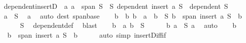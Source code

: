 \begin{isabellebody}
\isamarkupfalse%
%
\endisatagproof
{\isafoldproof}%
%
\isadelimproof
\isanewline
%
\endisadelimproof
\isanewline
{}\isamarkupfalse%
\ dependent{\isacharunderscore}{\kern0pt}insertD{\isacharcolon}{\kern0pt}\ \ a{\isacharcolon}{\kern0pt}\ {\isachardoublequoteopen}a\ {\isasymnotin}\ span\ S{\isachardoublequoteclose}\ \ S{\isacharcolon}{\kern0pt}\ {\isachardoublequoteopen}dependent\ {\isacharparenleft}{\kern0pt}insert\ a\ S{\isacharparenright}{\kern0pt}{\isachardoublequoteclose}\ \ {\isachardoublequoteopen}dependent\ S{\isachardoublequoteclose}\isanewline
%
\isadelimproof
%
\endisadelimproof
%
\isatagproof
{}\isamarkupfalse%
\ {\isacharminus}{\kern0pt}\isanewline
\ \ \isamarkupfalse%
\ {\isachardoublequoteopen}a\ {\isasymnotin}\ S{\isachardoublequoteclose}\ \isamarkupfalse%
\ a\ \isamarkupfalse%
\ {\isacharparenleft}{\kern0pt}auto\ dest{\isacharcolon}{\kern0pt}\ span{\isacharunderscore}{\kern0pt}base{\isacharparenright}{\kern0pt}\isanewline
\ \ \isamarkupfalse%
\ b\ \ b{\isacharcolon}{\kern0pt}\ {\isachardoublequoteopen}b\ {\isacharequal}{\kern0pt}\ a\ {\isasymor}\ b\ {\isasymin}\ S{\isachardoublequoteclose}\ {\isachardoublequoteopen}b\ {\isasymin}\ span\ {\isacharparenleft}{\kern0pt}insert\ a\ S\ {\isacharminus}{\kern0pt}\ {\isacharbraceleft}{\kern0pt}b{\isacharbraceright}{\kern0pt}{\isacharparenright}{\kern0pt}{\isachardoublequoteclose}\isanewline
\ \ \ \ \isamarkupfalse%
\ S\ \isamarkupfalse%
\ dependent{\isacharunderscore}{\kern0pt}def\ \isamarkupfalse%
\ blast\isanewline
\ \ \isamarkupfalse%
\ {\isachardoublequoteopen}b\ {\isasymnoteq}\ a{\isachardoublequoteclose}\ {\isachardoublequoteopen}b\ {\isasymin}\ S{\isachardoublequoteclose}\isanewline
\ \ \ \ \isamarkupfalse%
\ b\ {\isacartoucheopen}a\ {\isasymnotin}\ S{\isacartoucheclose}\ a\ \isamarkupfalse%
\ auto\isanewline
\ \ \isamarkupfalse%
\ b\ \isamarkupfalse%
\ {\isacharasterisk}{\kern0pt}{\isacharcolon}{\kern0pt}\ {\isachardoublequoteopen}b\ {\isasymin}\ span\ {\isacharparenleft}{\kern0pt}insert\ a\ {\isacharparenleft}{\kern0pt}S\ {\isacharminus}{\kern0pt}\ {\isacharbraceleft}{\kern0pt}b{\isacharbraceright}{\kern0pt}{\isacharparenright}{\kern0pt}{\isacharparenright}{\kern0pt}{\isachardoublequoteclose}\isanewline
\ \ \ \ \isamarkupfalse%
\ {\isacharparenleft}{\kern0pt}auto\ simp{\isacharcolon}{\kern0pt}\ insert{\isacharunderscore}{\kern0pt}Diff{\isacharunderscore}{\kern0pt}if{\isacharparenright}{\kern0pt}\isanewline

\end{isabellebody}
